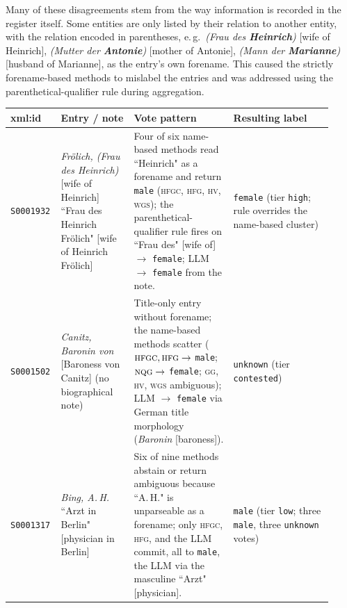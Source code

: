 \documentclass{eceasst}
\newcommand{\eg}{e.\,g.}
\begin{document}
Many of these disagreements stem from the way information is recorded in the register itself. Some entities are only listed by their relation to another entity, with the relation encoded in parentheses, \eg{~\emph{(Frau des \textbf{Heinrich})} [wife of Heinrich], \emph{(Mutter der \textbf{Antonie})} [mother of Antonie], \emph{(Mann der \textbf{Marianne})} [husband of Marianne]}, as the entry's own forename. This caused the strictly forename-based methods to mislabel the entries and was addressed using the parenthetical-qualifier rule during aggregation.

\begin{table}[h]
  \centering
  \scriptsize
  \setlength{\tabcolsep}{3pt}
  \begin{tabular}{p{0.10\linewidth} p{0.22\linewidth} p{0.30\linewidth} p{0.30\linewidth}}
    \toprule
    xml:id & Entry / note & Vote pattern & Resulting label \\
    \midrule
    \texttt{S0001932} &
      \textit{Frölich, (Frau des Heinrich)} [wife of Heinrich] \newline
      ``Frau des Heinrich Frölich" [wife of Heinrich Frölich] &
      Four of six name-based methods read ``Heinrich" as a forename and return \texttt{male} (\textsc{hfgc}, \textsc{hfg}, \textsc{hv}, \textsc{wgs}); the parenthetical-qualifier rule fires on ``Frau des" [wife of] $\rightarrow$ \texttt{female}; LLM $\rightarrow$ \texttt{female} from the note. &
      \texttt{female} (tier \texttt{high}; rule overrides the name-based cluster) \\
    \addlinespace
    \texttt{S0001502} &
      \textit{Canitz, Baronin von} [Baroness von Canitz] \newline
      (no biographical note) &
      Title-only entry without forename; the name-based methods scatter ($\textsc{hfgc},\textsc{hfg}\rightarrow$ \texttt{male}; $\textsc{nqg}\rightarrow$ \texttt{female}; \textsc{gg}, \textsc{hv}, \textsc{wgs} ambiguous); LLM $\rightarrow$ \texttt{female} via German title morphology (\emph{Baronin} [baroness]). &
      \texttt{unknown} (tier \texttt{contested}) \\
    \addlinespace
    \texttt{S0001317} &
      \textit{Bing, A.\,H.} \newline
      ``Arzt in Berlin" [physician in Berlin] &
      Six of nine methods abstain or return ambiguous because ``A.\,H." is unparseable as a forename; only \textsc{hfgc}, \textsc{hfg}, and the LLM commit, all to \texttt{male}, the LLM via the masculine ``Arzt" [physician]. &
      \texttt{male} (tier \texttt{low}; three \texttt{male}, three \texttt{unknown} votes) \\

\end{tabular}
\end{table}
\end{document}

